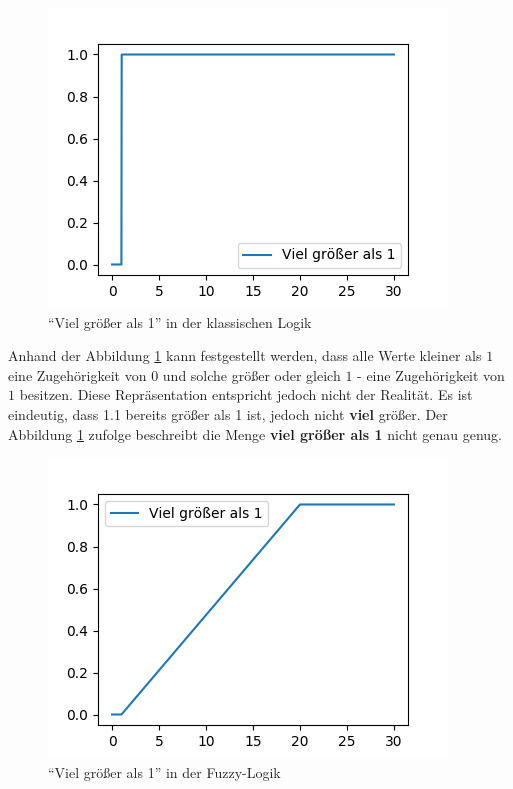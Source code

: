 
\begin{figure}[htbp]
	\centering
	\includegraphics[scale=0.5]{images/classic_logic.png}
	\caption{``Viel größer als 1'' in der klassischen Logik}\label{class_dar}
\end{figure}

Anhand der Abbildung \ref{class_dar} kann festgestellt werden, dass alle Werte kleiner als $1$ eine Zugehörigkeit von $0$ und solche größer oder gleich $1$ - eine Zugehörigkeit von $1$ besitzen. Diese Repräsentation entspricht jedoch nicht der Realität. Es ist eindeutig, dass 1.1 bereits größer als 1 ist, jedoch nicht \textbf{viel} größer. Der Abbildung \ref{class_dar} zufolge beschreibt die Menge \textbf{viel größer als 1} nicht genau genug.

\begin{figure}[htbp]
	\centering
	\includegraphics[scale=0.5]{images/fuzz_logic.png}
	\caption{``Viel größer als 1'' in der Fuzzy-Logik}\label{fuzzy_dar}
\end{figure}

